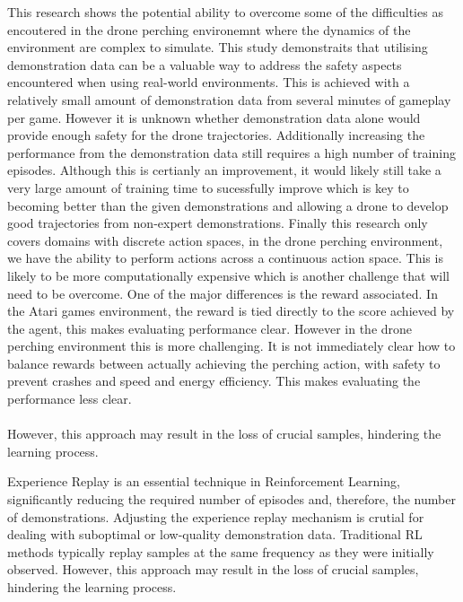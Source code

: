This research shows the potential ability to overcome some of the difficulties as encoutered in the drone perching environemnt where the dynamics of the environment are complex to simulate.
This study demonstraits that utilising demonstration data can be a valuable way to address the safety aspects encountered when using real-world environments.
This is achieved with a relatively small amount of demonstration data from several minutes of gameplay per game.
However it is unknown whether demonstration data alone would provide enough safety for the drone trajectories.
Additionally increasing the performance from the demonstration data still requires a high number of training episodes.
Although this is certianly an improvement, it would likely still take a very large amount of training time to sucessfully improve which is key to becoming better than the given demonstrations and allowing a drone to develop good trajectories from non-expert demonstrations.
Finally this research only covers domains with discrete action spaces, in the drone perching environment, we have the ability to perform actions across a continuous action space.
This is likely to be more computationally expensive which is another challenge that will need to be overcome.
One of the major differences is the reward associated.
In the Atari games environment, the reward is tied directly to the score achieved by the agent, this makes evaluating performance clear.
However in the drone perching environment this is more challenging.
It is not immediately clear how to balance rewards between actually achieving the perching action, with safety to prevent crashes and speed and energy efficiency.
This makes evaluating the performance less clear. \\\\



However, this approach may result in the loss of crucial samples, hindering the learning process.

Experience Replay is an essential technique in Reinforcement Learning, significantly reducing the required number of episodes and, therefore, the number of demonstrations.
Adjusting the experience replay mechanism is crutial for dealing with suboptimal or low-quality demonstration data.
Traditional RL methods typically replay samples at the same frequency as they were initially observed.
However, this approach may result in the loss of crucial samples, hindering the learning process.


